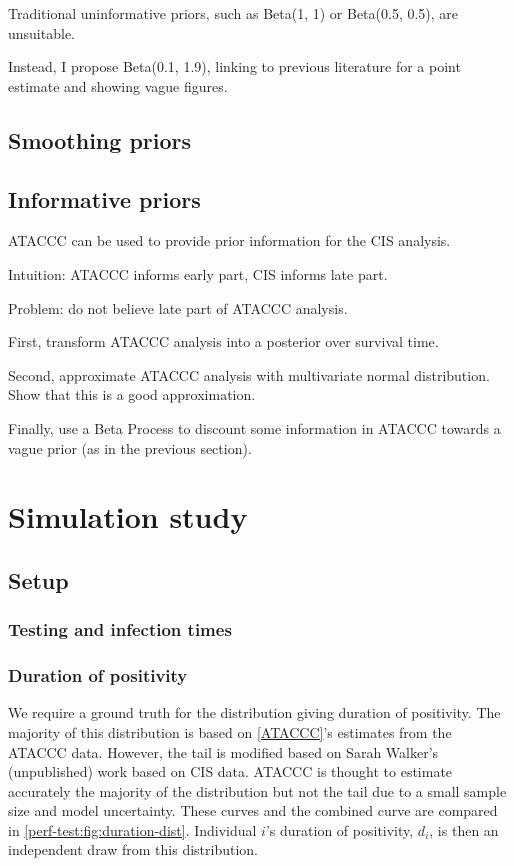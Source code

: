 \documentclass[thesis.tex]{subfiles}
\begin{document}
Traditional uninformative priors, such as Beta(1, 1) or Beta(0.5, 0.5), are unsuitable.

Instead, I propose Beta(0.1, 1.9), linking to previous literature for a point estimate and showing vague figures.

\subsection{Smoothing priors}

\subsection{Informative priors}

ATACCC can be used to provide prior information for the CIS analysis.

Intuition: ATACCC informs early part, CIS informs late part.

Problem: do not believe late part of ATACCC analysis.

First, transform ATACCC analysis into a posterior over survival time.

Second, approximate ATACCC analysis with multivariate normal distribution.
Show that this is a good approximation.

Finally, use a Beta Process to discount some information in ATACCC towards a vague prior (as in the previous section).

\section{Simulation study} \label{perf-test:sec:simulation-study}

\subsection{Setup}

\subsubsection{Testing and infection times}

\subsubsection{Duration of positivity}

We require a ground truth for the distribution giving duration of positivity.
The majority of this distribution is based on \autoref{ATACCC}'s estimates from the ATACCC data.
However, the tail is modified based on Sarah Walker's (unpublished) work based on CIS data.
ATACCC is thought to estimate accurately the majority of the distribution but not the tail due to a small sample size and model uncertainty.
These curves and the combined curve are compared in \autoref{perf-test:fig:duration-dist}.
Individual $i$'s duration of positivity, $d_i$, is then an independent draw from this distribution.
\end{document}
